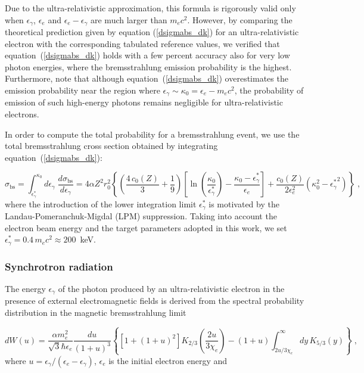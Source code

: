 \documentclass[fleqn,11pt]{wlscirep}
\begin{document}
Due to the ultra-relativistic approximation, this formula is rigorously valid only when $\epsilon_\gamma$, $\epsilon_e$ and $\epsilon_e-\epsilon_\gamma$ are much larger than $m_e c^2$. 
However, by comparing the theoretical prediction given by equation (\ref{dsigmabs_dk}) for an ultra-relativistic electron with the corresponding tabulated reference values\cite{Seltzer1986345}, we verified that equation~(\ref{dsigmabs_dk}) holds with a few percent accuracy also for very low photon energies, where the bremsstrahlung emission probability is the highest.  
Furthermore, note that although equation~(\ref{dsigmabs_dk}) overestimates the emission probability near the region where $\epsilon_\gamma\sim \kappa_0=\epsilon_e-m_ec^2$, the probability of emission of such high-energy photons remains negligible for ultra-relativistic electrons. 

In order to compute the total probability for a bremsstrahlung event, we use the total bremsstrahlung cross section obtained by integrating equation~(\ref{dsigmabs_dk}):

\begin{equation}
\sigma_\text{bs}=\int_{\epsilon^*_\gamma}^{\kappa_0}d\epsilon_\gamma\;\frac{d\sigma_\text{bs}}{d\epsilon_\gamma}=4\alpha Z^2r_0^2\left\{\left(\frac{4\,c_0(Z)}{3}+\frac{1}{9}\right)\left[\ln\left(\frac{\kappa_0}{\epsilon^*_\gamma}\right)-\frac{\kappa_0-\epsilon^*_\gamma}{\epsilon_e}\right]+\frac{c_0(Z)}{2\epsilon_e^2}\left(\kappa_0^2-{\epsilon^*_\gamma}^2\right)\right\}\;,
\end{equation}
where the introduction of the lower integration limit $\epsilon^*_\gamma$ is motivated by the Landau-Pomeranchuk-Migdal (LPM) suppression\cite{LP1,LP2,1956PhRv..103.1811M}. 
Taking into account the electron beam energy and the target parameters adopted in this work, we set $\epsilon^*_\gamma=0.4\,m_ec^2\approx 200$~keV. 

\subsubsection*{Synchrotron radiation}

The energy $\epsilon_\gamma$ of the photon produced by an ultra-relativistic electron in the presence of external electromagnetic fields is derived from the spectral probability distribution in the magnetic bremsstrahlung limit\cite{Ritus1985,BaierBook}

\begin{equation}
dW(u)=\frac{\alpha m_e^2}{\sqrt{3}\hbar \epsilon_e}\frac{du}{(1+u)^3}
\left\{
\left[1+(1+u)^2\right]K_{2/3}\left(\frac{2u}{3\chi_e}\right)
-(1+u)\int_{2u/3\chi_e}^{\infty}dy\,K_{5/3}(y)
\right\}\;,
\end{equation}
where $u=\epsilon_\gamma/(\epsilon_e-\epsilon_\gamma)$, $\epsilon_e$ is the initial electron energy and
\end{document}
